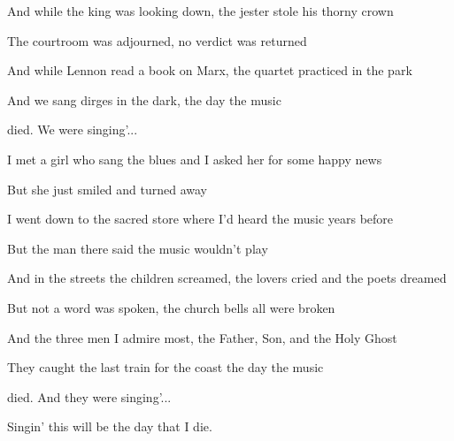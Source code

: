 \begin{song}
\bigskip

And while the king was looking down, the jester stole his thorny crown \par
The courtroom was adjourned, no verdict was returned \par
And while Lennon read a book on Marx, the quartet practiced in the park \par
And we sang dirges in the dark, the day the music \par
{}died.   We were singing'... \par

\bigskip

\Chorus \par

\bigskip

 \par
I met a girl who sang the blues and I asked her for some happy news \par
But she just smiled and turned away \par
I went down to the sacred store where I'd heard the music years before \par
But the man there said the music wouldn't play \par

\bigskip

And in the streets the children screamed, the lovers cried and the poets dreamed \par
But not a word was spoken, the church bells all were broken \par
And the three men I admire most, the Father, Son, and the Holy Ghost \par
They caught the last train for the coast the day the music \par
{}died. And they were singing'... \par

\bigskip

\Chorus \par
{} \par
Singin' this will be the day that I die. \par

\end{song}